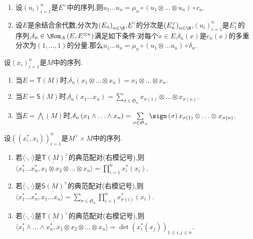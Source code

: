 \begin{lemma}{}{}
	\begin{enumerate}
		\item 设$\left(u_{i}\right)_{i=1}^{n}$是$E^{\vee}$中的序列,则$u_{1}\ldots u_{n}=\mu_{n}\circ\left(u_{1}\otimes\ldots\otimes u_{n}\right)\circ c_{n}$.
		\item 设$E$是余结合余代数,分次为$\left(E_{n}\right)_{n\in\N}$,$\underline{E}^{\vee}$的分次是$\left(E_{n}^{\vee}\right)_{n\in\N}$,$\left(u_{i}\right)_{i=1}^{n}$是$E_{1}^{\vee}$的序列,$\delta_{n}\in\Hom_{A}\left(E,E^{\otimes n}\right)$满足如下条件:对每个$x\in E$,$\delta_{n}\left(x\right)$是$c_{n}\left(x\right)$的多重分次为$\left(1,\ldots,1\right)$的分量.那么$u_{1}\ldots u_{n}=\mu_{n}\circ\left(u_{1}\otimes\ldots u_{n}\right)\circ\delta_{n}$.
	\end{enumerate}
\end{lemma}

\begin{remark}{}{}
	设$\left(x_{i}\right)_{i=1}^{n}$是$M$中的序列.
	\begin{enumerate}
		\item 当$E=\mathsf{T}\left(M\right)$时,$\delta_{n}\left(x_{1}\otimes\ldots\otimes x_{n}\right)=x_{1}\otimes\ldots\otimes x_{n}$.
		\item 当$E=\mathsf{S}\left(M\right)$时,$\delta_{n}\left(x_{1}\ldots x_{n}\right)=\sum\limits_{\sigma\in\mathfrak{S}_{n}}x_{\sigma\left(1\right)}\otimes\ldots\otimes x_{\sigma\left(n\right)}$.
		\item 当$E=\bigwedge\left(M\right)$时,$\delta_{n}\left(x_{1}\wedge\ldots\wedge x_{n}\right)=\sum\limits_{\sigma\in\mathfrak{S}_{n}}\sign\left(\sigma\right)x_{\sigma\left(1\right)}\otimes\ldots\otimes x_{\sigma\left(n\right)}$.
	\end{enumerate}
\end{remark}

\begin{proposition}{}{}
	设$\left(\left(x_{i}^{\ast},x_{i}\right)\right)_{i=1}^{n}$是$M^{\vee}\times M$中的序列.
	\begin{enumerate}
		\item 若$\langle\cdot,\cdot\rangle$是$\underline{\mathsf{T}\left(M\right)}^{\vee}$的典范配对(右模记号),则$\langle x_{1}^{\ast}\ldots x_{n}^{\ast},x_{1}\otimes x_{2}\otimes\ldots\otimes x_{n}\rangle=\prod\limits_{i=1}^{n}x_{i}^{\ast}\left(x_{i}\right)$.
		\item 若$\langle\cdot,\cdot\rangle$是$\underline{\mathsf{S}\left(M\right)}^{\vee}$的典范配对(右模记号),则$\langle x_{1}^{\ast}\ldots x_{n}^{\ast},x_{1}\ldots x_{n}\rangle=\sum\limits_{\sigma\in\mathfrak{S}_{n}}\prod\limits_{i=1}^{n}x_{\sigma\left(i\right)}^{\ast}\left(x_{i}\right)$.
		\item 若$\langle\cdot,\cdot\rangle$是$\underline{\mathsf{T}\left(M\right)}^{\vee}$的典范配对(右模记号),则$\langle x_{1}^{\ast}\wedge\ldots\wedge x_{n}^{\ast},x_{1}\otimes x_{2}\otimes\ldots\otimes x_{n}\rangle=\det\left(x_{i}^{\ast}\left(x_{j}\right)\right)_{1\leq i,j\leq n}$.
	\end{enumerate}
\end{proposition}

